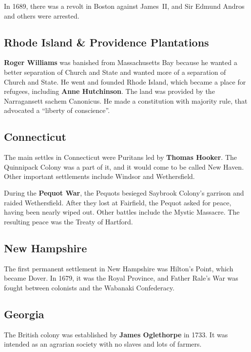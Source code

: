 In 1689, there was a revolt in Boston against James~II, and Sir Edmund Andros and others were arrested.


\subsection*{Rhode Island \& Providence Plantations}

\textbf{Roger Williams} was banished from Massachusetts Bay because he wanted a better separation of Church and State
and wanted more of a separation of Church and State.
He went and founded Rhode Island, which became a place for refugees, including \textbf{Anne Hutchinson}.
The land was provided by the Narragansett sachem Canonicus.
He made a constitution with majority rule, that advocated a ``liberty of conscience''.

\subsection*{Connecticut}

The main settles in Connecticut were Puritans led by \textbf{Thomas Hooker}.
The Quinnipack Colony was a part of it, and it would come to be called New Haven.
Other important settlements include Windsor and Wethersfield.

During the \textbf{Pequot War}, the Pequots besieged Saybrook Colony's garrison and raided Wethersfield.
After they lost at Fairfield, the Pequot asked for peace, having been nearly wiped out.
Other battles include the Mystic Massacre.
The resulting peace was the Treaty of Hartford.

\subsection*{New Hampshire}

The first permanent settlement in New Hampshire was Hilton's Point, which became Dover.
In 1679, it was the Royal Province,
and Father Rale's War was fought between colonists and the Wabanaki Confederacy.

\subsection*{Georgia}

The British colony was established by \textbf{James Oglethorpe} in 1733.
It was intended as an agrarian society with no slaves and lots of farmers.

